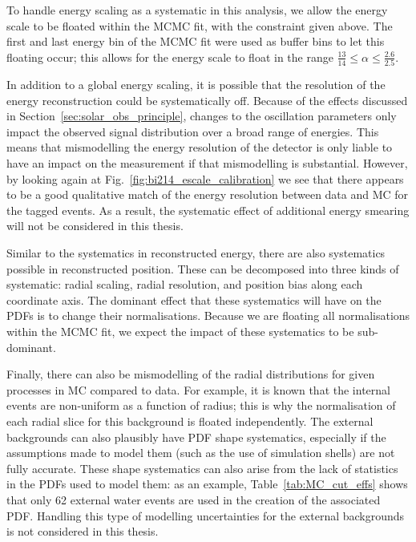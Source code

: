 To handle energy scaling as a systematic in this analysis, we allow the energy scale to be floated within the MCMC fit, with the constraint given above. The first and last energy bin of the MCMC fit were used as buffer bins to let this floating occur; this allows for the energy scale to float in the range $\frac{13}{14}\leq\alpha\leq\frac{2.6}{2.5}$.

In addition to a global energy scaling, it is possible that the resolution of the energy reconstruction could be systematically off. Because of the effects discussed in Section~\ref{sec:solar_obs_principle}, changes to the oscillation parameters only impact the observed signal distribution over a broad range of energies. This means that mismodelling the energy resolution of the detector is only liable to have an impact on the measurement if that mismodelling is substantial. However, by looking again at Fig.~\ref{fig:bi214_escale_calibration} we see that there appears to be a good qualitative match of the energy resolution between data and MC for the tagged  events. As a result, the systematic effect of additional energy smearing will not be considered in this thesis.

Similar to the systematics in reconstructed energy, there are also systematics possible in reconstructed position. These can be decomposed into three kinds of systematic: radial scaling, radial resolution, and position bias along each coordinate axis. The dominant effect that these systematics will have on the PDFs is to change their normalisations. Because we are floating all normalisations within the MCMC fit, we expect the impact of these systematics to be sub-dominant. 

Finally, there can also be mismodelling of the radial distributions for given processes in MC compared to data. For example, it is known that the internal  events are non-uniform as a function of radius; this is why the normalisation of each radial slice for this background is floated independently. The external backgrounds can also plausibly have PDF shape systematics, especially if the assumptions made to model them (such as the use of simulation shells) are not fully accurate. These shape systematics can also arise from the lack of statistics in the PDFs used to model them: as an example, Table~\ref{tab:MC_cut_effs} shows that only 62 external water  events are used in the creation of the associated PDF. Handling this type of modelling uncertainties for the external backgrounds is not considered in this thesis.

